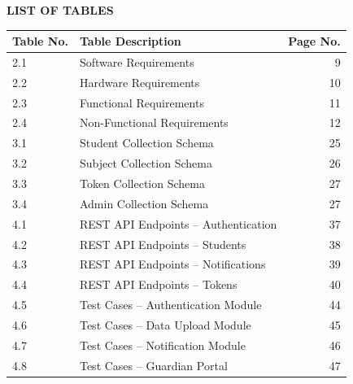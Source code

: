 \documentclass[12pt,a4paper]{report}
\begin{document}
\newpage
\begin{center}{\fontsize{16pt}{18pt}\selectfont\textbf{LIST OF TABLES}}\end{center}
\begin{table}[H]
\renewcommand{\arraystretch}{1.3}
\centering
{\fontsize{12pt}{14pt}\selectfont
\begin{tabular*}{\textwidth}{@{\extracolsep{\fill}} l >{\raggedright\arraybackslash}p{9cm} r}
\toprule
\textbf{Table No.} & \textbf{Table Description} & \textbf{Page No.}\\
\midrule
2.1 & Software Requirements & 9\\
2.2 & Hardware Requirements & 10\\
2.3 & Functional Requirements & 11\\
2.4 & Non-Functional Requirements & 12\\
3.1 & Student Collection Schema & 25\\
3.2 & Subject Collection Schema & 26\\
3.3 & Token Collection Schema & 27\\
3.4 & Admin Collection Schema & 27\\
4.1 & REST API Endpoints -- Authentication & 37\\
4.2 & REST API Endpoints -- Students & 38\\
4.3 & REST API Endpoints -- Notifications & 39\\
4.4 & REST API Endpoints -- Tokens & 40\\
4.5 & Test Cases -- Authentication Module & 44\\
4.6 & Test Cases -- Data Upload Module & 45\\
4.7 & Test Cases -- Notification Module & 46\\
4.8 & Test Cases -- Guardian Portal & 47\\
\bottomrule
\end{tabular*}}
\end{table}
\end{document}
